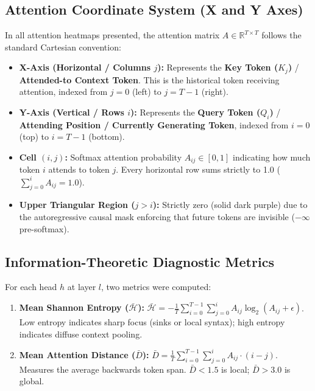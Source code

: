 \documentclass[10pt,a4paper]{article}
\begin{document}
\subsection{Attention Coordinate System (X and Y Axes)}
In all attention heatmaps presented, the attention matrix $A \in \mathbb{R}^{T \times T}$ follows the standard Cartesian convention:
\begin{itemize}[noitemsep,leftmargin=*]
    \item \textbf{X-Axis (Horizontal / Columns $j$):} Represents the \textbf{Key Token ($K_j$)} / \textbf{Attended-to Context Token}. This is the historical token receiving attention, indexed from $j=0$ (left) to $j=T-1$ (right).
    \item \textbf{Y-Axis (Vertical / Rows $i$):} Represents the \textbf{Query Token ($Q_i$)} / \textbf{Attending Position / Currently Generating Token}, indexed from $i=0$ (top) to $i=T-1$ (bottom).
    \item \textbf{Cell $(i, j)$:} Softmax attention probability $A_{ij} \in [0, 1]$ indicating how much token $i$ attends to token $j$. Every horizontal row sums strictly to 1.0 ($\sum_{j=0}^{i} A_{ij} = 1.0$).
    \item \textbf{Upper Triangular Region ($j > i$):} Strictly zero (solid dark purple) due to the autoregressive causal mask enforcing that future tokens are invisible ($-\infty$ pre-softmax).
\end{itemize}

\subsection{Information-Theoretic Diagnostic Metrics}
For each head $h$ at layer $l$, two metrics were computed:
\begin{enumerate}[noitemsep,leftmargin=*]
    \item \textbf{Mean Shannon Entropy ($\bar{\mathcal{H}}$):}
    $\bar{\mathcal{H}} = -\frac{1}{T} \sum_{i=0}^{T-1} \sum_{j=0}^{i} A_{ij} \log_2 (A_{ij} + \epsilon)$. Low entropy indicates sharp focus (sinks or local syntax); high entropy indicates diffuse context pooling.
    \item \textbf{Mean Attention Distance ($\bar{D}$):}
    $\bar{D} = \frac{1}{T} \sum_{i=0}^{T-1} \sum_{j=0}^{i} A_{ij} \cdot (i - j)$. Measures the average backwards token span. $\bar{D} < 1.5$ is local; $\bar{D} > 3.0$ is global.
\end{enumerate}
\end{document}
